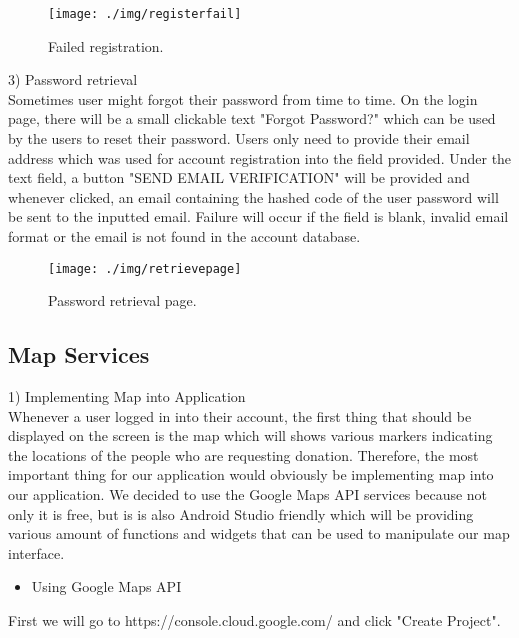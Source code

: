 \documentclass[conference]{IEEEtran}
\begin{document}
\begin{figure}[h!]
\texttt{[image: ./img/registerfail]}
\centering
\caption{Failed registration.}
\end{figure}

3) Password retrieval\\
Sometimes user might forgot their password from time to time. On the login page, there will be a small clickable text "Forgot Password?" which can be used by the users to reset their password. Users only need to provide their email address which was used for account registration into the field provided. Under the text field, a button "SEND EMAIL VERIFICATION" will be provided and whenever clicked, an email containing the hashed code of the user password will be sent to the inputted email. Failure will occur if the field is blank, invalid email format or the email is not found in the account database.

\begin{figure}[h!]
\texttt{[image: ./img/retrievepage]}
\centering
\caption{Password retrieval page.}
\end{figure}

\subsection{Map Services}

1) Implementing Map into Application\\

Whenever a user logged in into their account, the first thing that should be displayed on the screen is the map which will shows various markers indicating the locations of the people who are requesting donation. Therefore, the most important thing for our application would obviously be implementing map into our application. We decided to use the Google Maps API services because not only it is free, but is is also Android Studio friendly which will be providing various amount of functions and widgets that can be used to manipulate our map interface.\\

\begin{itemize}
\item Using Google Maps API
\end{itemize}
First we will go to https://console.cloud.google.com/ and click "Create Project".
\end{document}
